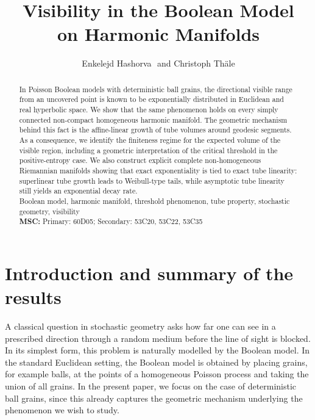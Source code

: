 \documentclass[11pt,a4paper]{article}
\theoremstyle{plain}
\theoremstyle{definition}
\theoremstyle{remark}
\begin{document}
\title{\bfseries Visibility in the Boolean Model \\ on Harmonic Manifolds}

\author{Enkelejd Hashorva\footnotemark[1]\,\, and Christoph Th\"ale\footnotemark[2]}

\date{}
\renewcommand{\thefootnote}{\fnsymbol{footnote}}

\maketitle

\begin{abstract}
	\noindent
	In Poisson Boolean models with deterministic ball grains, the directional visible range from an uncovered point is known to be exponentially distributed in Euclidean and real hyperbolic space. We show that the same phenomenon holds on every simply connected non-compact homogeneous harmonic manifold. The geometric mechanism behind this fact is the affine-linear growth of tube volumes around geodesic segments. As a consequence, we identify the finiteness regime for the expected volume of the visible region, including a geometric interpretation of the critical threshold in the positive-entropy case. We also construct explicit complete non-homogeneous Riemannian manifolds showing that exact exponentiality is tied to exact tube linearity: superlinear tube growth leads to Weibull-type tails, while asymptotic tube linearity still yields an exponential decay rate.
	\\
	
	 Boolean model, harmonic manifold, threshold phenomenon, tube property, stochastic geometry, visibility\\
	{\bf MSC:} Primary: 60D05; Secondary: 53C20, 53C22, 53C35
\end{abstract}


\section{Introduction and summary of the results}

A classical question in stochastic geometry asks how far one can see in a prescribed direction through a random medium before the line of sight is blocked. In its simplest form, this problem is naturally modelled by the Boolean model. In the standard Euclidean setting, the Boolean model is obtained by placing grains, for example balls, at the points of a homogeneous Poisson process and taking the union of all grains. In the present paper, we focus on the case of deterministic ball grains, since this already captures the geometric mechanism underlying the phenomenon we wish to study.
\end{document}
